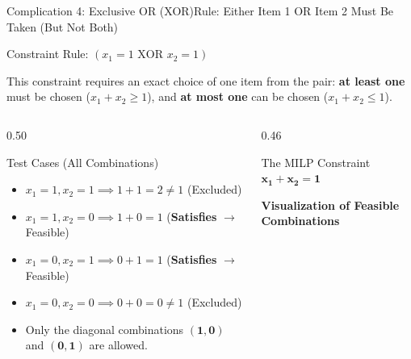 \documentclass[aspectratio=169]{beamer}
\newenvironment{constraintblock}[1]{
    \begin{block}{Constraint Rule: #1}
    \vspace{-0.3em}
}{
    \end{block}
}
\begin{document}
\begin{frame}{Complication 4: Exclusive OR (XOR)}{Rule: Either Item 1 OR Item 2 Must Be Taken (But Not Both)}
    \vspace{-0.2em}
    \begin{constraintblock}{$(x_1 = 1 \text{ XOR } x_2 = 1)$}
        This constraint requires an exact choice of one item from the pair: \textbf{at least one} must be chosen ($x_1 + x_2 \ge 1$), and \textbf{at most one} can be chosen ($x_1 + x_2 \le 1$).
    \end{constraintblock}
    \vspace{-0.2em}
    \begin{columns}[T]
        \begin{column}{0.50\textwidth}
            \begin{alertblock}{Test Cases (All Combinations)}
                \footnotesize
                \begin{itemize}
                    \item $x_1=1, x_2=1 \implies 1+1 = 2 \ne 1$ (\alert{Excluded})
                    \item $x_1=1, x_2=0 \implies 1+0 = 1$ (\textbf{Satisfies} $\rightarrow$ Feasible)
                    \item $x_1=0, x_2=1 \implies 0+1 = 1$ (\textbf{Satisfies} $\rightarrow$ Feasible)
                    \item $x_1=0, x_2=0 \implies 0+0 = 0 \ne 1$ (\alert{Excluded})
                \end{itemize}
            \end{alertblock}
            \footnotesize
            \begin{itemize}
                \item Only the diagonal combinations $(\mathbf{1, 0})$ and $(\mathbf{0, 1})$ are allowed.
            \end{itemize}
        \end{column}
        \begin{column}{0.46\textwidth}
            \begin{block}{The MILP Constraint}
                \centering $\mathbf{x_1 + x_2 = 1}$
            \end{block}
            \centering
            \footnotesize \textbf{Visualization of Feasible Combinations}\\[2pt]
\end{column}
\end{columns}
\end{frame}
\end{document}
